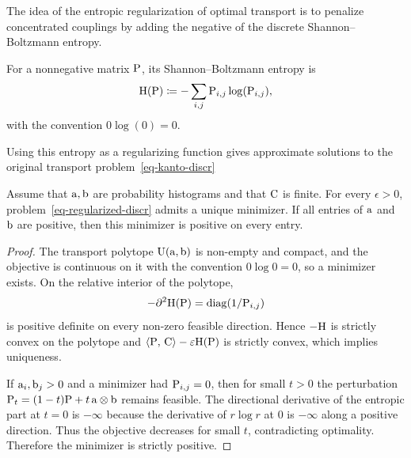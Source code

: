 The idea of the entropic regularization of optimal transport is to penalize concentrated couplings by adding the negative of the discrete Shannon--Boltzmann entropy.

\begin{defn}\label{def-discrete-shannon-boltzmann-entropy}
	For a nonnegative matrix $\P$, its Shannon--Boltzmann entropy is
	\[
		\HD(\P) \eqdef -\sum_{i,j} \P_{i,j} \log(\P_{i,j}),
	\]
	with the convention $0\log(0)=0$.
\end{defn}
Using this entropy as a regularizing function gives approximate solutions to the original transport problem~\eqref{eq-kanto-discr}

\begin{prop}\label{prop-entropic-unique}
	Assume that $\a,\b$ are probability histograms and that $\C$ is finite. For every $\epsilon>0$, problem~\eqref{eq-regularized-discr} admits a unique minimizer. If all entries of $\a$ and $\b$ are positive, then this minimizer is positive on every entry.
\end{prop}

\begin{proof}
	The transport polytope $\CouplingsD(\a,\b)$ is non-empty and compact, and the objective is continuous on it with the convention $0\log0=0$, so a minimizer exists. On the relative interior of the polytope,
	\[
		-\partial^2 \HD(\P)=\diag(1/\P_{i,j})
	\]
	is positive definite on every non-zero feasible direction. Hence $-\HD$ is strictly convex on the polytope and $\dotp{\P}{\C}-\epsilon\HD(\P)$ is strictly convex, which implies uniqueness.

	If $\a_i,\b_j>0$ and a minimizer had $\P_{i,j}=0$, then for small $t>0$ the perturbation $\P_t=(1-t)\P+t\,\a\otimes\b$ remains feasible. The directional derivative of the entropic part at $t=0$ is $-\infty$ because the derivative of $r\log r$ at $0$ is $-\infty$ along a positive direction. Thus the objective decreases for small $t$, contradicting optimality. Therefore the minimizer is strictly positive.
\end{proof}


